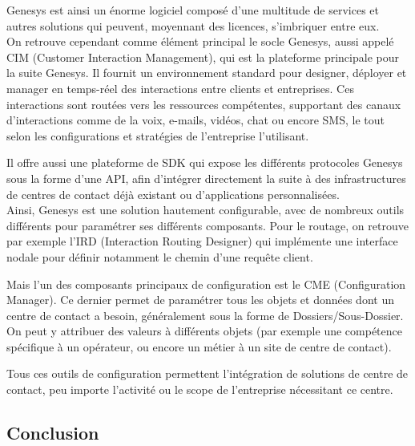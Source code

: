 \documentclass{rapport}
\begin{document}

Genesys est ainsi un énorme logiciel composé d'une multitude de services et autres solutions qui peuvent, moyennant des licences, s'imbriquer entre eux.\\

On retrouve cependant comme élément principal le socle Genesys, aussi appelé CIM (Customer Interaction Management), qui est la plateforme principale pour la suite Genesys. Il fournit un environnement standard pour designer, déployer et manager en temps-réel des interactions entre clients et entreprises.
Ces interactions sont routées vers les ressources compétentes, supportant des canaux d'interactions comme de la voix, e-mails, vidéos, chat ou encore SMS, le tout selon les configurations et stratégies de l'entreprise l'utilisant.

Il offre aussi une plateforme de SDK qui expose les différents protocoles Genesys sous la forme d'une API, afin d'intégrer directement la suite à des infrastructures de centres de contact déjà existant ou d'applications personnalisées.\\

Ainsi, Genesys est une solution hautement configurable, avec de nombreux outils différents pour paramétrer ses différents composants. Pour le routage, on retrouve par exemple l'IRD (Interaction Routing Designer) qui implémente une interface nodale pour définir notamment le chemin d'une requête client.

Mais l'un des composants principaux de configuration est le CME (Configuration Manager). Ce dernier permet de paramétrer tous les objets et données dont un centre de contact a besoin, généralement sous la forme de Dossiers/Sous-Dossier. On peut y attribuer des valeurs à différents objets (par exemple une compétence spécifique à un opérateur, ou encore un métier à un site de centre de contact).


Tous ces outils de configuration permettent l'intégration de solutions de centre de contact, peu importe l'activité ou le scope de l'entreprise nécessitant ce centre.

\subsection*{Conclusion}
\end{document}
